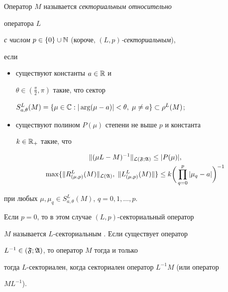 


\begin{defnm} Оператор $M$ называется {\it секториальным относительно} 


оператора $L$ 


{\it с числом} $p\in\{0\}\cup\Bbb N$ (короче, $(L,p)${\it-секториальным}),


если 


\begin{itemize} 


\item[(i)] существуют константы $a\in\Bbb R$ и 


$\theta\in\left(\frac{\pi}{2},\pi\right)$ такие, что сектор \newline




$S^L_{a,\theta}(M)=\{\mu\in\Bbb C:|\arg(\mu-a)|<\theta,\;\mu\ne a\} 


\subset \rho^L(M)$; 


\item[(ii)] существуют полином $P(\mu)$ степени не выше $p$ и константа 


$k\in\Bbb R_+$ такие, что 


\begin{gather*} 


\|(\mu L-M)^{-1}\|_{\cal L(\frak F;\frak A)}\le |P(\mu)|, \\ 


\max\{\|R^L_{(\mu,p)}(M)\|_{\cal L(\frak A)},\; 


\|L^L_{(\mu,p)}(M)\|\}\le 


k\biggl(\,\prod^p_{q=0}|\mu_q-a|\biggr)^{-1} 


\end{gather*} 


\end{itemize}


при любых $\mu,\mu_q\in S^L_{a,\theta}(M)$, $q=0,1,\dotsc,p$. 


\end{defnm} 


 


\begin{notem} Если $p=0$, то в этом случае $(L,p)$-секториальный оператор 


$M$ называется $L$-секториальным \cite{Sv5}. Если существует оператор 


$L^{-1}\in\cal(\frak F;\frak A)$, то оператор $M$ тогда и только 


тогда $L$-секториален, когда секториален оператор $L^{-1}M$ (или оператор 


$ML^{-1}$). 


\end{notem} 


